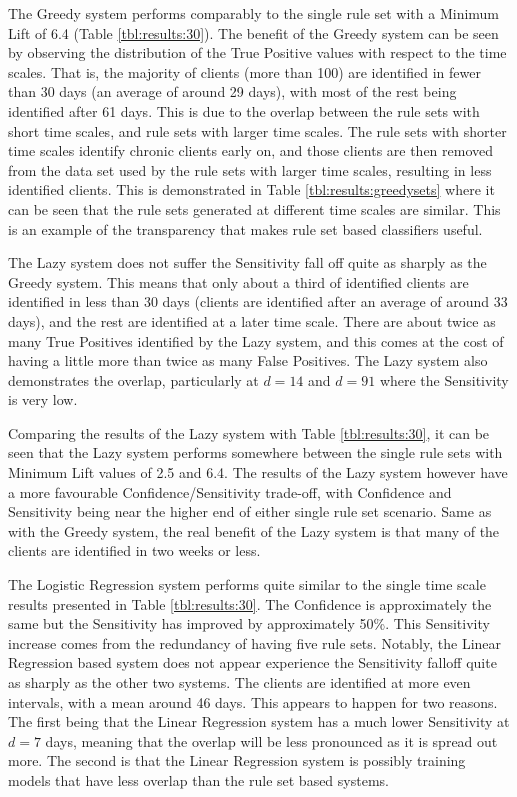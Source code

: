 The Greedy system performs comparably to the single rule set with a Minimum Lift of 6.4 (Table \ref{tbl:results:30}). The benefit of the Greedy system can be seen by observing the distribution of the True Positive values with respect to the time scales. That is, the majority of clients (more than 100) are identified in fewer than 30 days (an average of around 29 days), with most of the rest being identified after 61 days. This is due to the overlap between the rule sets with short time scales, and rule sets with larger time scales. The rule sets with shorter time scales identify chronic clients early on, and those clients are then removed from the data set used by the rule sets with larger time scales, resulting in less identified clients. This is demonstrated in Table \ref{tbl:results:greedysets} where it can be seen that the rule sets generated at different time scales are similar. This is an example of the transparency that makes rule set based classifiers useful.

The Lazy system does not suffer the Sensitivity fall off quite as sharply as the Greedy system. This means that only about a third of identified clients are identified in less than 30 days (clients are identified after an average of around 33 days), and the rest are identified at a later time scale. There are about twice as many True Positives identified by the Lazy system, and this comes at the cost of having a little more than twice as many False Positives. The Lazy system also demonstrates the overlap, particularly at $d=14$ and $d=91$ where the Sensitivity is very low.

Comparing the results of the Lazy system with Table \ref{tbl:results:30}, it can be seen that the Lazy system performs somewhere between the single rule sets with Minimum Lift values of 2.5 and 6.4. The results of the Lazy system however have a more favourable Confidence/Sensitivity trade-off, with Confidence and Sensitivity being near the higher end of either single rule set scenario. Same as with the Greedy system, the real benefit of the Lazy system is that many of the clients are identified in two weeks or less.

The Logistic Regression system performs quite similar to the single time scale results presented in Table \ref{tbl:results:30}. The Confidence is approximately the same but the Sensitivity has improved by approximately 50\%. This Sensitivity increase comes from the redundancy of having five rule sets. Notably, the Linear Regression based system does not appear experience the Sensitivity falloff quite as sharply as the other two systems. The clients are identified at more even intervals, with a mean around 46 days. This appears to happen for two reasons. The first being that the Linear Regression system has a much lower Sensitivity at $d=7$ days, meaning that the overlap will be less pronounced as it is spread out more. The second is that the Linear Regression system is possibly training models that have less overlap than the rule set based systems. 

